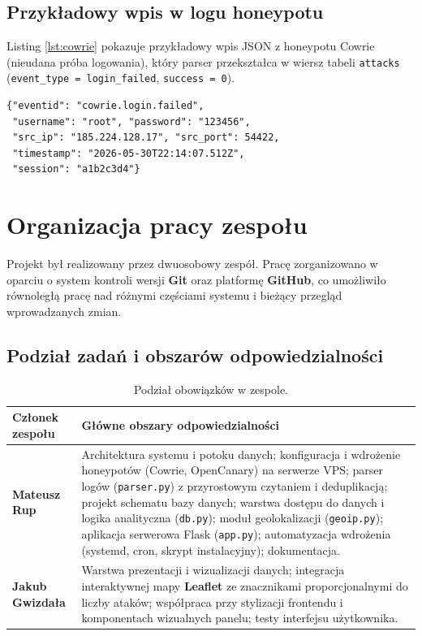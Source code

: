 \documentclass[12pt,a4paper]{report}
\begin{document}
\section{Przykładowy wpis w logu honeypotu}

Listing \ref{lst:cowrie} pokazuje przykładowy wpis JSON z honeypotu Cowrie
(nieudana próba logowania), który parser przekształca w wiersz tabeli
\texttt{attacks} (\texttt{event\_type = login\_failed}, \texttt{success = 0}).

\begin{lstlisting}[caption={Przykładowy wpis JSON z logu Cowrie.},label={lst:cowrie}]
{"eventid": "cowrie.login.failed",
 "username": "root", "password": "123456",
 "src_ip": "185.224.128.17", "src_port": 54422,
 "timestamp": "2026-05-30T22:14:07.512Z",
 "session": "a1b2c3d4"}
\end{lstlisting}

\chapter{Organizacja pracy zespołu}
\label{ch:team}

Projekt był realizowany przez dwuosobowy zespół. Pracę zorganizowano w oparciu
o system kontroli wersji \textbf{Git} oraz platformę \textbf{GitHub}, co
umożliwiło równoległą pracę nad różnymi częściami systemu i bieżący przegląd
wprowadzanych zmian.

\section{Podział zadań i obszarów odpowiedzialności}

\begin{table}[ht]
\centering
\small
\begin{tabularx}{\textwidth}{>{\raggedright\arraybackslash}p{3.6cm} X}
\toprule
\textbf{Członek zespołu} & \textbf{Główne obszary odpowiedzialności} \\
\midrule
\textbf{Mateusz Rup} &
Architektura systemu i potoku danych; konfiguracja i wdrożenie honeypotów
(Cowrie, OpenCanary) na serwerze VPS; parser logów (\texttt{parser.py})
z przyrostowym czytaniem i deduplikacją; projekt schematu bazy danych; warstwa
dostępu do danych i logika analityczna (\texttt{db.py}); moduł geolokalizacji
(\texttt{geoip.py}); aplikacja serwerowa Flask (\texttt{app.py}); automatyzacja
wdrożenia (systemd, cron, skrypt instalacyjny); dokumentacja. \\
\midrule
\textbf{Jakub Gwizdała} &
Warstwa prezentacji i wizualizacji danych; integracja interaktywnej mapy
\textbf{Leaflet} ze znacznikami proporcjonalnymi do liczby ataków; współpraca
przy stylizacji frontendu i komponentach wizualnych panelu; testy interfejsu
użytkownika. \\
\bottomrule
\end{tabularx}
\caption{Podział obowiązków w zespole.}
\label{tab:team}
\end{table}
\end{document}
